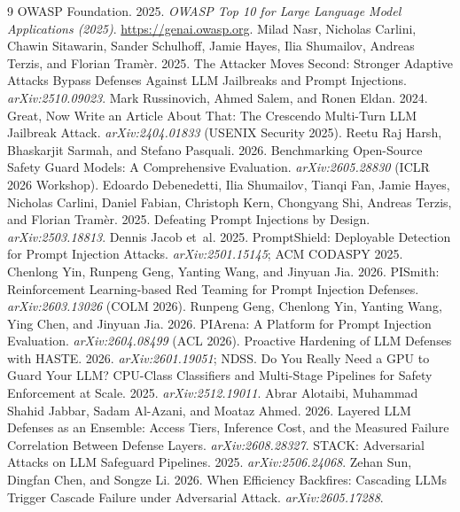 \documentclass[11pt]{article}
\begin{document}
\begin{thebibliography}{9}
 OWASP Foundation. 2025. \emph{OWASP Top 10 for Large Language Model Applications (2025)}. \url{https://genai.owasp.org}.
 Milad Nasr, Nicholas Carlini, Chawin Sitawarin, Sander Schulhoff, Jamie Hayes, Ilia Shumailov, Andreas Terzis, and Florian Tram\`er. 2025. The Attacker Moves Second: Stronger Adaptive Attacks Bypass Defenses Against LLM Jailbreaks and Prompt Injections. \emph{arXiv:2510.09023}.
 Mark Russinovich, Ahmed Salem, and Ronen Eldan. 2024. Great, Now Write an Article About That: The Crescendo Multi-Turn LLM Jailbreak Attack. \emph{arXiv:2404.01833} (USENIX Security 2025).
 Reetu Raj Harsh, Bhaskarjit Sarmah, and Stefano Pasquali. 2026. Benchmarking Open-Source Safety Guard Models: A Comprehensive Evaluation. \emph{arXiv:2605.28830} (ICLR 2026 Workshop).
 Edoardo Debenedetti, Ilia Shumailov, Tianqi Fan, Jamie Hayes, Nicholas Carlini, Daniel Fabian, Christoph Kern, Chongyang Shi, Andreas Terzis, and Florian Tram\`er. 2025. Defeating Prompt Injections by Design. \emph{arXiv:2503.18813}.
 Dennis Jacob et~al. 2025. PromptShield: Deployable Detection for Prompt Injection Attacks. \emph{arXiv:2501.15145}; ACM CODASPY 2025.
 Chenlong Yin, Runpeng Geng, Yanting Wang, and Jinyuan Jia. 2026. PISmith: Reinforcement Learning-based Red Teaming for Prompt Injection Defenses. \emph{arXiv:2603.13026} (COLM 2026).
 Runpeng Geng, Chenlong Yin, Yanting Wang, Ying Chen, and Jinyuan Jia. 2026. PIArena: A Platform for Prompt Injection Evaluation. \emph{arXiv:2604.08499} (ACL 2026).
 Proactive Hardening of LLM Defenses with HASTE. 2026. \emph{arXiv:2601.19051}; NDSS.
 Do You Really Need a GPU to Guard Your LLM? CPU-Class Classifiers and Multi-Stage Pipelines for Safety Enforcement at Scale. 2025. \emph{arXiv:2512.19011}.
 Abrar Alotaibi, Muhammad Shahid Jabbar, Sadam Al-Azani, and Moataz Ahmed. 2026. Layered LLM Defenses as an Ensemble: Access Tiers, Inference Cost, and the Measured Failure Correlation Between Defense Layers. \emph{arXiv:2608.28327}.
 STACK: Adversarial Attacks on LLM Safeguard Pipelines. 2025. \emph{arXiv:2506.24068}.
 Zehan Sun, Dingfan Chen, and Songze Li. 2026. When Efficiency Backfires: Cascading LLMs Trigger Cascade Failure under Adversarial Attack. \emph{arXiv:2605.17288}.
\end{thebibliography}
\end{document}
